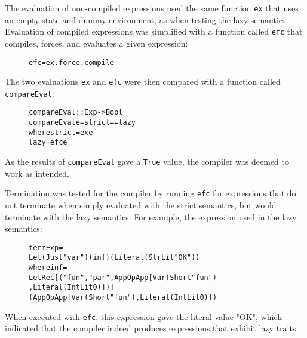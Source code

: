 The evaluation of non-compiled
expressions used the same function \texttt{ex} that uses an empty state and
dummy environment, as when testing the lazy semantics. Evaluation of
compiled expressions was simplified with a function called \texttt{efc} that
compiles, forces, and evaluates a given expression:

\begin{figure}[H]
\begin{alltt}
  efc = ex . force . compile
\end{alltt}
\end{figure}

\noindent The two evaluations \texttt{ex} and \texttt{efc} were then compared
with a function called \texttt{compareEval}:

\begin{figure}[H]
\begin{alltt}
  compareEval :: Exp -> Bool
  compareEval e = strict == lazy
    where strict = ex e
          lazy   = efc e
\end{alltt}
\end{figure}

\noindent As the results of \texttt{compareEval} gave a \texttt{True} value,
the compiler was deemed to work as intended.

Termination was tested for the compiler by running \texttt{efc} for expressions
that do not terminate when simply evaluated with the strict semantics, but would
terminate with the lazy semantics. For example, the expression used in the lazy
semantics:

\begin{figure}[H]
\begin{alltt}
  termExp =
    Let (Just "var") (inf) (Literal (StrLit "OK"))
    where inf =
      LetRec [("fun", "par", App OpApp [Var (Short "fun")
                                       ,Literal (IntLit 0)])]
      (App OpApp [Var (Short "fun"), Literal (IntLit 0)])
\end{alltt}
\end{figure}

\noindent When executed with \texttt{efc}, this expression gave the literal
value "OK", which indicated that the compiler indeed produces expressions that
exhibit lazy traits.

